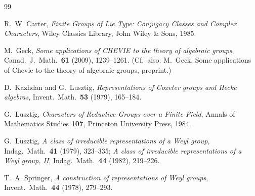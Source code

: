 \documentclass[12pt]{amsart}
\begin{document}
\begin{thebibliography}{99}

R.~W. Carter,
\textit{Finite Groups of Lie Type: Conjugacy Classes and Complex Characters},
Wiley Classics Library, John Wiley \& Sons, 1985.

M.~Geck,
\textit{Some applications of CHEVIE to the theory of algebraic groups},
Canad.\ J.\ Math.\ \textbf{61} (2009), 1239--1261.
(Cf.\ also: M.~Geck, Some applications of Chevie to the theory of algebraic
groups, preprint.)

D.~Kazhdan and G.~Lusztig,
\textit{Representations of Coxeter groups and Hecke algebras},
Invent.\ Math.\ \textbf{53} (1979), 165--184.

G.~Lusztig,
\textit{Characters of Reductive Groups over a Finite Field},
Annals of Mathematics Studies \textbf{107},
Princeton University Press, 1984.

G.~Lusztig,
\textit{A class of irreducible representations of a Weyl group},
Indag.\ Math.\ \textbf{41} (1979), 323--335;
\textit{A class of irreducible representations of a Weyl group, II},
Indag.\ Math.\ \textbf{44} (1982), 219--226.

T.~A. Springer,
\textit{A construction of representations of Weyl groups},
Invent.\ Math.\ \textbf{44} (1978), 279--293.

\end{thebibliography}
\end{document}
